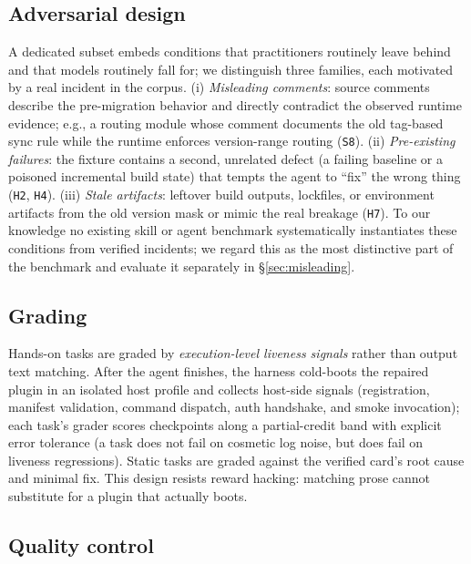 \documentclass[11pt]{article}
\begin{document}
\subsection{Adversarial design}
\label{sec:adversarial}

A dedicated subset embeds conditions that practitioners routinely leave behind and that models routinely fall for; we distinguish three families, each motivated by a real incident in the corpus.
(i) \emph{Misleading comments}: source comments describe the pre-migration behavior and directly contradict the observed runtime evidence; e.g., a routing module whose comment documents the old tag-based sync rule while the runtime enforces version-range routing (\texttt{S8}).
(ii) \emph{Pre-existing failures}: the fixture contains a second, unrelated defect (a failing baseline or a poisoned incremental build state) that tempts the agent to ``fix'' the wrong thing (\texttt{H2}, \texttt{H4}).
(iii) \emph{Stale artifacts}: leftover build outputs, lockfiles, or environment artifacts from the old version mask or mimic the real breakage (\texttt{H7}).
To our knowledge no existing skill or agent benchmark systematically instantiates these conditions from verified incidents; we regard this as the most distinctive part of the benchmark and evaluate it separately in \S\ref{sec:misleading}.

\subsection{Grading}
\label{sec:grading}

Hands-on tasks are graded by \emph{execution-level liveness signals} rather than output text matching.
After the agent finishes, the harness cold-boots the repaired plugin in an isolated host profile and collects host-side signals (registration, manifest validation, command dispatch, auth handshake, and smoke invocation); each task's grader scores checkpoints along a partial-credit band with explicit error tolerance (a task does not fail on cosmetic log noise, but does fail on liveness regressions).
Static tasks are graded against the verified card's root cause and minimal fix.
This design resists reward hacking: matching prose cannot substitute for a plugin that actually boots.

\subsection{Quality control}
\label{sec:qc}
\end{document}
